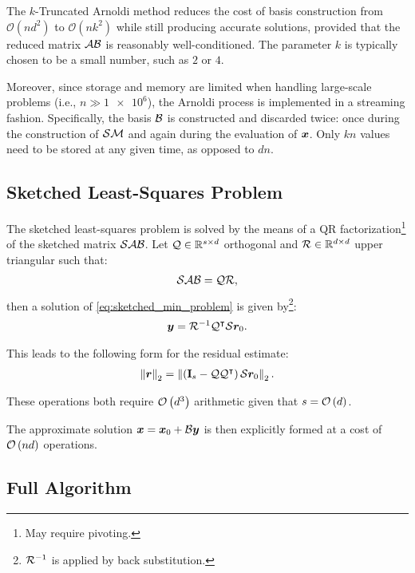 The $k$-Truncated Arnoldi method reduces the cost of basis construction from $\mathcal{O}(n d^2)$ to $\mathcal{O}(n k^2)$ while still producing accurate solutions, provided that the reduced matrix $\mathcal{A} \mathcal{B}$ is reasonably well-conditioned. The parameter $k$ is typically chosen to be a small number, such as $2$ or $4$.

Moreover, since storage and memory are limited when handling large-scale problems (i.e., $n \gg \num{1e6}$), the Arnoldi process is implemented in a streaming fashion. Specifically, the basis $\mathcal{B}$ is constructed and discarded twice: once during the construction of $\mathcal{S} \mathcal{M}$ and again during the evaluation of $\bm{x}$. Only $k n$ values need to be stored at any given time, as opposed to $d n$.

\newpage
\subsection{Sketched Least-Squares Problem} \label{sseq:least_squares}

The sketched least-squares problem is solved by the means of a QR factorization\footnote{May require pivoting.} of the sketched matrix $\mathcal{S} \mathcal{A} \mathcal{B}$. Let $\mathcal{Q} \in \mathbb{R}^{s \times d}$ orthogonal and $\mathcal{R} \in \mathbb{R}^{d \times d}$ upper triangular such that:
\begin{align}
    \mathcal{S} \mathcal{A} \mathcal{B} = \mathcal{Q} \mathcal{R},
\end{align}
then a solution of \cref{eq:sketched_min_problem} is given by\footnote{$\mathcal{R}^{-1}$ is applied by back substitution.}:
\begin{align}
    \bm{y} = \mathcal{R}^{-1} \mathcal{Q}^{\intercal} \mathcal{S} \bm{r}_0.
\end{align}

This leads to the following form for the residual estimate:
\begin{align}
    \left\lVert \bm{r} \right\rVert_2 = \left\lVert  \left( \mathbf{I}_s - \mathcal{Q} \mathcal{Q}^{\intercal} \right) \mathcal{S} \bm{r}_0  \right\rVert_2.
\end{align}

These operations both require $\mathcal{O} \left( d^3 \right)$ arithmetic given that $s = \mathcal{O} \left( d \right)$.

The approximate solution $\bm{x} = \bm{x}_0 + \mathcal{B} \bm{y}$ is then explicitly formed at a cost of $\mathcal{O} \left( n d \right)$ operations.

\subsection{Full Algorithm} \label{sseq:algorithm}

